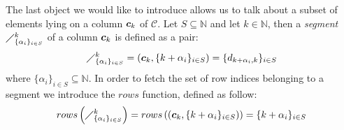 The last object we would like to introduce allows us 
to talk about a subset of elements lying on a
column $\boldsymbol{c}_{k}$ of $\mathcal{C}$. Let $S\subseteq\mathbb{N}$  
and let $k\in\mathbb{N}$, then a \emph{segment} $\diagup_{\lbrace\alpha_{i}\rbrace_{i\in S}}^{k}$ 
of a column $\boldsymbol{c}_{k}$ is defined as a pair:
\begin{equation}
    \diagup_{\lbrace\alpha_{i}\rbrace_{i\in S}}^{k}
        = \left(\boldsymbol{c}_{k},\lbrace k+\alpha_{i}\rbrace_{i\in S}\right)
        = \lbrace d_{k+\alpha_{i},k}\rbrace_{i\in S}
    \label{eq:column:segment}
\end{equation}
where $\lbrace\alpha_{i}\rbrace_{i\in S}\subseteq\mathbb{N}$. In order to fetch the set of 
row indices belonging to a segment we introduce the $rows$ function, defined as follow:
\begin{displaymath}
    rows\left(\diagup_{\lbrace\alpha_{i}\rbrace_{i\in S}}^{k}\right)
        = rows\left(\left(\boldsymbol{c}_{k},\lbrace k+\alpha_{i}\rbrace_{i\in S}\right)\right)
        = \lbrace k+\alpha_{i}\rbrace_{i\in S}
    \label{eq:column:segment:rows:function}
\end{displaymath}


